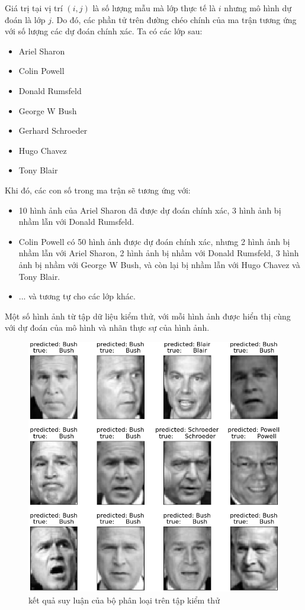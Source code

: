 \documentclass[12pt,a4paper,oneside]{report}
\numberwithin{equation}{section}
\begin{document}
Giá trị tại vị trí $(i, j)$ là số lượng mẫu mà lớp thực tế là $i$ nhưng mô hình dự đoán là lớp $j$. Do đó, các phần tử trên đường chéo chính của ma trận tương ứng với số lượng các dự đoán chính xác.
Ta có các lớp sau:

\begin{itemize}
	\item Ariel Sharon
	\item Colin Powell
	\item Donald Rumsfeld
	\item George W Bush
	\item Gerhard Schroeder
	\item Hugo Chavez
	\item Tony Blair
\end{itemize}
Khi đó, các con số trong ma trận sẽ tương ứng với:

\begin{itemize}
	\item 10 hình ảnh của Ariel Sharon đã được dự đoán chính xác, 3 hình ảnh bị nhầm lẫn với Donald Rumsfeld.
	\item Colin Powell có 50 hình ảnh được dự đoán chính xác, nhưng 2 hình ảnh bị nhầm lẫn với Ariel Sharon, 2 hình ảnh bị nhầm với Donald Rumsfeld, 3 hình ảnh bị nhầm với George W Bush, và còn lại bị nhầm lẫn với Hugo Chavez và Tony Blair.
	\item ... và tương tự cho các lớp khác.
\end{itemize}

Một số hình ảnh từ tập dữ liệu kiểm thử, với mỗi hình ảnh được hiển thị cùng với dự đoán của mô hình và nhãn thực sự của hình ảnh.

\begin{figure}[htp]
	\centering
	\includegraphics[scale=0.8]{predict_pca.png}
	\caption{kết quả suy luận của bộ phân loại trên tập kiểm thử}
	\label{fig:output}
\end{figure}
\end{document}
